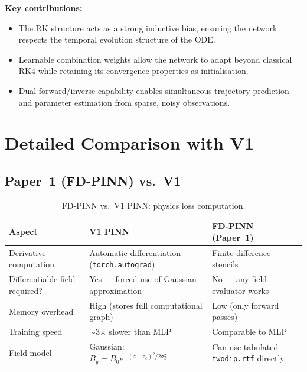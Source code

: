 \documentclass[12pt,a4paper]{article}
\begin{document}
\medskip
\noindent\textbf{Key contributions:}
\begin{itemize}
\item The RK structure acts as a strong inductive bias, ensuring the network respects the temporal evolution structure of the ODE.
\item Learnable combination weights allow the network to adapt beyond classical RK4 while retaining its convergence properties as initialisation.
\item Dual forward/inverse capability enables simultaneous trajectory prediction and parameter estimation from sparse, noisy observations.
\end{itemize}

\section{Detailed Comparison with V1}
\label{sec:comparison}

\subsection{Paper~1 (FD-PINN) vs.\ V1}

\begin{table}[h]
\centering
\caption{FD-PINN vs.\ V1 PINN: physics loss computation.}
\label{tab:comp_fdpinn}
\begin{tabular}{p{4cm}p{5cm}p{5cm}}
\toprule
\textbf{Aspect} & \textbf{V1 PINN} & \textbf{FD-PINN (Paper~1)} \\
\midrule
Derivative computation & Automatic differentiation (\texttt{torch.autograd}) & Finite difference stencils \\
Differentiable field required? & Yes --- forced use of Gaussian approximation & No --- any field evaluator works \\
Memory overhead & High (stores full computational graph) & Low (only forward passes) \\
Training speed & $\sim$3$\times$ slower than MLP & Comparable to MLP \\
Field model & Gaussian: $B_y = B_0 e^{-(z-z_c)^2/2\sigma_z^2}$ & Can use tabulated \texttt{twodip.rtf} directly \\
\bottomrule
\end{tabular}
\end{table}
\end{document}
